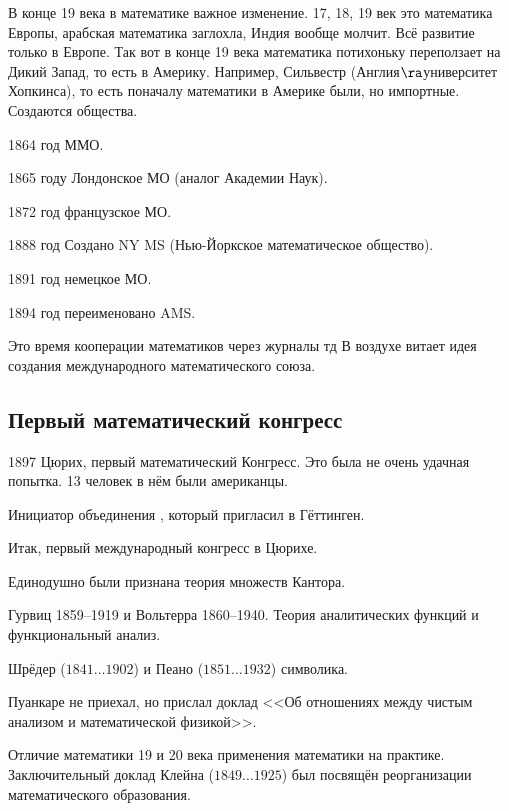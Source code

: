 \documentclass[a4paper,oneside,fleqn,10pt]{article}
\newcommand{\pe}[2]{${#1}\ldots{#2}$}
\begin{document}
В конце 19 века в математике важное изменение. 17, 18, 19 век это математика Европы,
арабская математика заглохла, Индия вообще молчит. Всё развитие только в Европе.
Так вот в конце 19 века математика потихоньку переползает на Дикий Запад, то есть в Америку.
Например, Сильвестр (Англия$\ra$университет Хопкинса), то есть поначалу математики в Америке были,
но импортные. Создаются общества.

\begin{items}{-2}
\item 1864 год ММО.
\item 1865 году Лондонское МО (аналог Академии Наук).
\item 1872 год французское МО.
\item 1888 год Создано NY MS (Нью-Йоркское математическое общество).
\item 1891 год немецкое МО.
\item 1894 год переименовано AMS.
\end{items}

Это время кооперации математиков через журналы тд В воздухе витает идея создания
международного математического союза.

\subsection{Первый математический конгресс}

1897 Цюрих, первый математический Конгресс. Это была не очень удачная попытка.
13 человек в нём были американцы.

Инициатор объединения , который пригласил 
в Гёттинген.

Итак, первый международный конгресс в Цюрихе.

\begin{items}{-2}
\item Единодушно были признана теория множеств Кантора.
\item Гурвиц 1859--1919 и Вольтерра 1860--1940. Теория аналитических функций и функциональный анализ.
\item Шрёдер (\pe{1841}{1902}) и Пеано (\pe{1851}{1932}) символика.
\item Пуанкаре не приехал, но прислал доклад <<Об отношениях между чистым анализом
и математической физикой>>.
\end{items}

Отличие математики 19 и 20 века применения математики на практике.
Заключительный доклад Клейна (\pe{1849}{1925}) был посвящён реорганизации математического образования.
\end{document}
